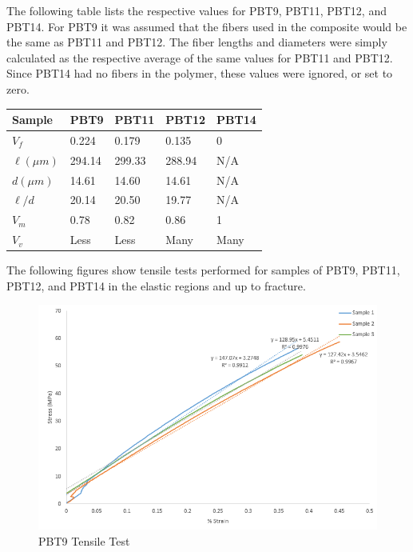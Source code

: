 \documentclass[11pt]{article}
\begin{document}
The following table lists the respective values for PBT9, PBT11, PBT12, and PBT14. For PBT9 it was assumed that the fibers used in the composite would be the same as PBT11 and PBT12. The fiber lengths and diameters were simply calculated as the respective average of the same values for PBT11 and PBT12.
Since PBT14 had no fibers in the polymer, these values were ignored, or set to zero.
\onehalfspacing
\begin{center}
 \label{tab:MeasuredValues}
\begin{tabular}{p{1.5cm} || p{} | p{} | p{} | p{}}
\hline
Sample & \multicolumn{1}{c|}{PBT9} & \multicolumn{1}{c|}{PBT11} & \multicolumn{1}{c|}{PBT12} & \multicolumn{1}{c}{PBT14} \\
\hline
\hline
\(V_f\) & 0.224 & 0.179 & 0.135 & 0\\
\(\ell (\mu m)\) & 294.14 & 299.33 & 288.94 & N/A\\
\(d (\mu m) \) & 14.61 & 14.60 & 14.61 & N/A\\
\(\ell /d\) & 20.14 & 20.50 & 19.77 & N/A\\
\(V_m\) & 0.78 & 0.82 & 0.86 & 1 \\
\(V_v\) & Less & Less & Many & Many\\
\hline
\end{tabular}
\end{center}
\singlespacing
\vspace{1em}

The following figures show tensile tests performed for samples of PBT9, PBT11, PBT12, and PBT14 in the elastic regions and up to fracture.
\\
\begin{figure}[H]
\centering
\includegraphics[width=.95\linewidth]{figures/PBT9_Tensile.png}
\caption{PBT9 Tensile Test}
\label{pbt9tensile}
\end{figure}
\end{document}
